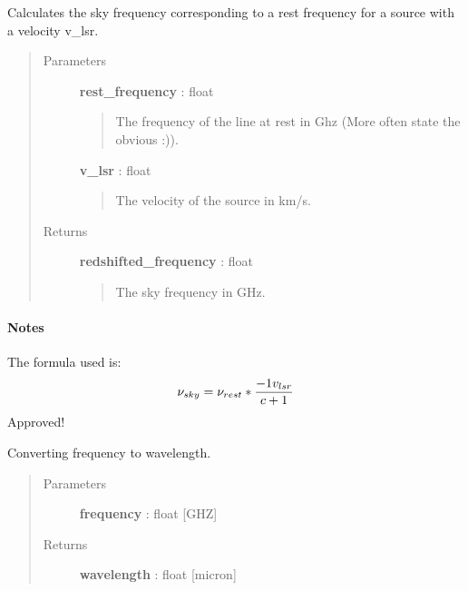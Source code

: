 \documentclass[a4paper,10pt,english]{sphinxmanual}
\begin{document}
\begin{fulllineitems}
\label{functions:astrolyze.functions.astro_functions.redshifted_frequency}
Calculates the sky frequency corresponding to a rest frequency for a
source with a velocity v\_lsr.
\begin{quote}\begin{description}
\item[{Parameters }] \leavevmode
\textbf{rest\_frequency} : float
\begin{quote}

The frequency of the line at rest in Ghz (More often state the obvious
:)).
\end{quote}

\textbf{v\_lsr} : float
\begin{quote}

The velocity of the source in km/s.
\end{quote}

\item[{Returns }] \leavevmode
\textbf{redshifted\_frequency} : float
\begin{quote}

The sky frequency in GHz.
\end{quote}

\end{description}\end{quote}
\paragraph{Notes}

The formula used is:
\begin{gather}
\begin{split}\nu_{sky} = \nu_{rest} * \frac{-1 v_{lsr}}{c + 1}\end{split}\notag
\end{gather}
Approved!

\end{fulllineitems}


\begin{fulllineitems}
\label{functions:astrolyze.functions.astro_functions.frequency_to_wavelength}
Converting frequency to wavelength.
\begin{quote}\begin{description}
\item[{Parameters }] \leavevmode
\textbf{frequency} : float {[}GHZ{]}

\item[{Returns }] \leavevmode
\textbf{wavelength} : float {[}micron{]}

\end{description}\end{quote}

\end{fulllineitems}
\end{document}
